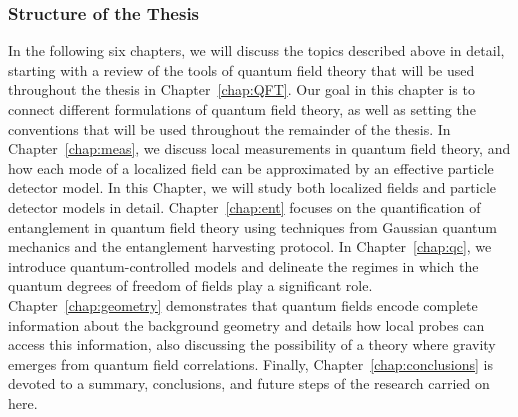 \documentclass[letterpaper,12pt,titlepage,oneside,final]{book}
\begin{document}




\subsubsection*{Structure of the Thesis}

In the following six chapters, we will discuss the topics described above in detail, starting with a review of the tools of quantum field theory that will be used throughout the thesis in Chapter~\ref{chap:QFT}. Our goal in this chapter is to connect different formulations of quantum field theory, as well as setting the conventions that will be used throughout the remainder of the thesis. In Chapter~\ref{chap:meas}, we discuss local measurements in quantum field theory, and how each mode of a localized field can be approximated by an effective particle detector model. In this Chapter, we will study both localized fields and particle detector models in detail. Chapter~\ref{chap:ent} focuses on the quantification of entanglement in quantum field theory using techniques from Gaussian quantum mechanics and the entanglement harvesting protocol. In Chapter~\ref{chap:qc}, we introduce quantum-controlled models and delineate the regimes in which the quantum degrees of freedom of fields play a significant role. Chapter~\ref{chap:geometry} demonstrates that quantum fields encode complete information about the background geometry and details how local probes can access this information, also discussing the possibility of a theory where gravity emerges from quantum field correlations. Finally, Chapter~\ref{chap:conclusions} is devoted to a summary, conclusions, and future steps of the research carried on here.
\end{document}
